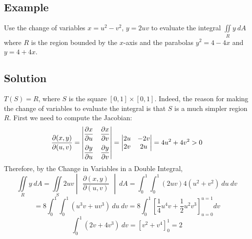 \subsection*{Example}
Use the change of variables $x=u^2-v^2$, $y=2uv$ to evaluate the integral
$\iint\limits_R y\:dA$ where $R$ is the region bounded by the $x$-axis and the
parabolas $y^2=4-4x$ and $y=4+4x$.

\subsection*{Solution}
$T(S)=R$, where $S$ is the square $[0,1]\times[0,1]$. Indeed, the reason for making
the change of variables to evaluate the integral is that $S$ is a much simpler region
$R$. First we need to compute the Jacobian:
$$\pdv{(x,y)}{(u,v)}=
    \begin{vmatrix}
        \dfrac{\partial x}{\partial u} & \dfrac{\partial x}{\partial v} \\[1em]
        \dfrac{\partial y}{\partial u} & \dfrac{\partial y}{\partial v}
    \end{vmatrix}
    =\begin{vmatrix}
        2u & -2v \\
        2v & 2u
    \end{vmatrix}
    =4u^2+4v^2>0$$
Therefore, by the Change in Variables in a Double Integral,
$$\iint\limits_R y\:dA=\iint\limits_S 2uv \begin{vmatrix}
        \dfrac{\partial (x,y)}{\partial (u,v)}
    \end{vmatrix}\:dA=\int_0^1\int_0^1
    (2uv)4(u^2+v^2)\:du\:dv$$
$$=8\int_0^1\int_0^1(u^3v+uv^3)\:du\:dv=8\int_0^1\left[\frac{1}{4}u^4v+
        \frac{1}{2}u^2v^3\right]_{u=0}^{u=1}dv$$
$$\int_0^1(2v+4v^3)\:dv=\left[v^2+v^4\right]_0^1=2$$